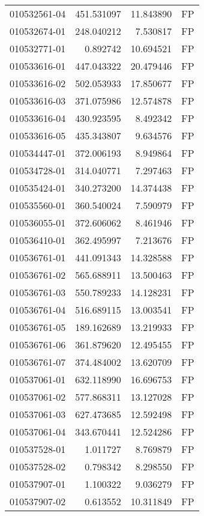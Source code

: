 \begin{tabular}{lrrl}
010532561-04 &  451.531097 &    11.843890 &   FP \\
010532674-01 &  248.040212 &     7.530817 &   FP \\
010532771-01 &    0.892742 &    10.694521 &   FP \\
010533616-01 &  447.043322 &    20.479446 &   FP \\
010533616-02 &  502.053933 &    17.850677 &   FP \\
010533616-03 &  371.075986 &    12.574878 &   FP \\
010533616-04 &  430.923595 &     8.492342 &   FP \\
010533616-05 &  435.343807 &     9.634576 &   FP \\
010534447-01 &  372.006193 &     8.949864 &   FP \\
010534728-01 &  314.040771 &     7.297463 &   FP \\
010535424-01 &  340.273200 &    14.374438 &   FP \\
010535560-01 &  360.540024 &     7.590979 &   FP \\
010536055-01 &  372.606062 &     8.461946 &   FP \\
010536410-01 &  362.495997 &     7.213676 &   FP \\
010536761-01 &  441.091343 &    14.328588 &   FP \\
010536761-02 &  565.688911 &    13.500463 &   FP \\
010536761-03 &  550.789233 &    14.128231 &   FP \\
010536761-04 &  516.689115 &    13.003541 &   FP \\
010536761-05 &  189.162689 &    13.219933 &   FP \\
010536761-06 &  361.879620 &    12.495455 &   FP \\
010536761-07 &  374.484002 &    13.620709 &   FP \\
010537061-01 &  632.118990 &    16.696753 &   FP \\
010537061-02 &  577.868311 &    13.127028 &   FP \\
010537061-03 &  627.473685 &    12.592498 &   FP \\
010537061-04 &  343.670441 &    12.524286 &   FP \\
010537528-01 &    1.011727 &     8.769879 &   FP \\
010537528-02 &    0.798342 &     8.298550 &   FP \\
010537907-01 &    1.100322 &     9.036279 &   FP \\
010537907-02 &    0.613552 &    10.311849 &   FP \\

\end{tabular}
